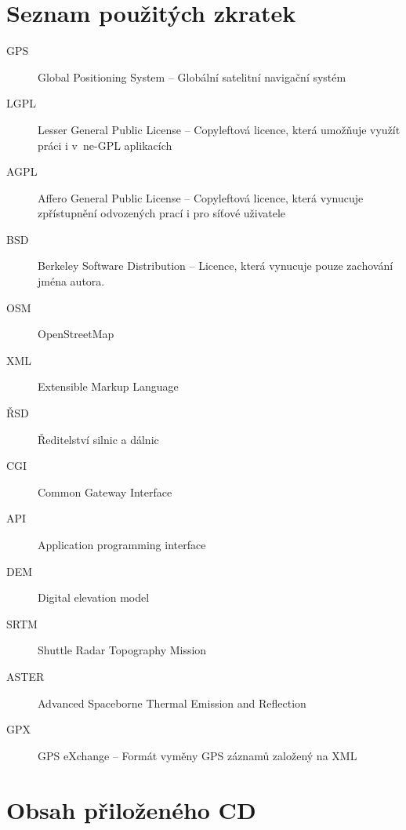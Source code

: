 \documentclass[thesis=B,czech]{FITthesis}[2012/06/26]
\begin{document}
\chapter{Seznam použitých zkratek}
\begin{description}
	\item[GPS] Global Positioning System -- Globální satelitní navigační systém
	\item[LGPL] Lesser General Public License -- Copyleftová licence, která umožňuje využít práci i v~ne-GPL aplikacích
	\item[AGPL] Affero General Public License -- Copyleftová licence, která vynucuje zpřístupnění odvozených prací i pro síťové uživatele
	\item[BSD] Berkeley Software Distribution -- Licence, která vynucuje pouze zachování jména autora.
	\item[OSM] OpenStreetMap
	\item[XML] Extensible Markup Language
	\item[ŘSD] Ředitelství silnic a dálnic
	\item[CGI] Common Gateway Interface
	\item[API] Application programming interface
	\item[DEM] Digital elevation model 
	\item[SRTM] Shuttle Radar Topography Mission
	\item[ASTER] Advanced Spaceborne Thermal Emission and Reflection
	\item[GPX] GPS eXchange -- Formát vyměny GPS záznamů založený na XML
	
\end{description}


\chapter{Obsah přiloženého CD}


\begin{figure}
\end{figure}
\end{document}
